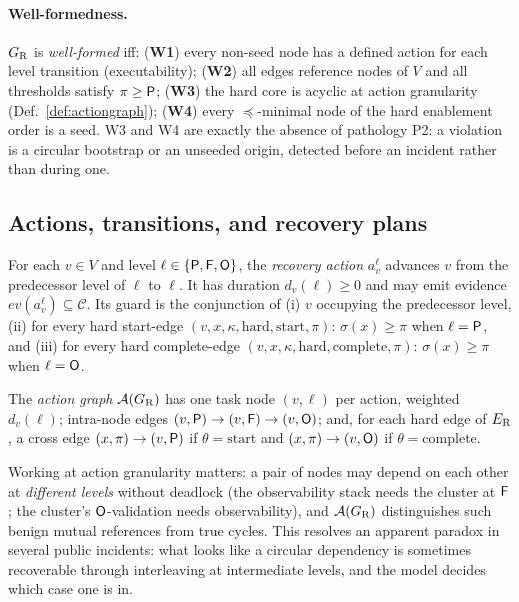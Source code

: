 \paragraph{Well-formedness.} $G_{\mathrm{R}}$ is \emph{well-formed} iff: (\textbf{W1}) every non-seed node has a defined action for each level transition (executability); (\textbf{W2}) all edges reference nodes of $V$ and all thresholds satisfy $\pi \geq \mathsf{P}$; (\textbf{W3}) the hard core is acyclic at action granularity (Def.~\ref{def:actiongraph}); (\textbf{W4}) every $\preceq$-minimal node of the hard enablement order is a seed. W3 and W4 are exactly the absence of pathology P2: a violation is a circular bootstrap or an unseeded origin, detected before an incident rather than during one.

\subsection{Actions, transitions, and recovery plans}
\label{sec:transitions}

\begin{definition}
\label{def:actions}
For each $v \in V$ and level $\ell \in \{\mathsf{P}, \mathsf{F}, \mathsf{O}\}$, the \emph{recovery action} $a_v^{\ell}$ advances $v$ from the predecessor level of $\ell$ to $\ell$. It has duration $d_v(\ell) \geq 0$ and may emit evidence $\mathit{ev}(a_v^{\ell}) \subseteq \mathcal{C}$. Its guard is the conjunction of (i) $v$ occupying the predecessor level, (ii) for every hard start-edge $(v, x, \kappa, \text{hard}, \text{start}, \pi)$: $\sigma(x) \geq \pi$ when $\ell = \mathsf{P}$, and (iii) for every hard complete-edge $(v, x, \kappa, \text{hard}, \text{complete}, \pi)$: $\sigma(x) \geq \pi$ when $\ell = \mathsf{O}$.
\end{definition}

\begin{definition}
\label{def:actiongraph}
The \emph{action graph} $\mathcal{A}(G_{\mathrm{R}})$ has one task node $(v,\ell)$ per action, weighted $d_v(\ell)$; intra-node edges $(v,\mathsf{P}) \to (v,\mathsf{F}) \to (v,\mathsf{O})$; and, for each hard edge of $E_{\mathrm{R}}$, a cross edge $(x,\pi) \to (v,\mathsf{P})$ if $\theta = \text{start}$ and $(x,\pi) \to (v,\mathsf{O})$ if $\theta = \text{complete}$.
\end{definition}

Working at action granularity matters: a pair of nodes may depend on each other at \emph{different levels} without deadlock (the observability stack needs the cluster at $\mathsf{F}$; the cluster's $\mathsf{O}$-validation needs observability), and $\mathcal{A}(G_{\mathrm{R}})$ distinguishes such benign mutual references from true cycles. This resolves an apparent paradox in several public incidents: what looks like a circular dependency is sometimes recoverable through interleaving at intermediate levels, and the model decides which case one is in.

